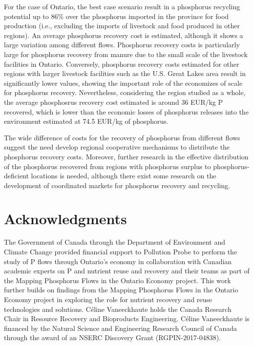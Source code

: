 \documentclass[authoryear]{elsarticle}
\begin{document}
For the case of Ontario, the best case scenario result in a phosphorus recycling potential up to 86\% over the phosphorus imported in the province for food production (i.e., excluding the imports of livestock and food produced in other regions). An average phosphorus recovery cost is estimated, although it shows a large variation among different flows. Phosphorus recovery costs is particularly large for phosphorus recovery from manure due to the small scale of the livestock facilities in Ontario. Conversely, phosphorus recovery costs estimated for other regions with larger livestock facilities such as the U.S. Great Lakes area result in significantly lower values, showing the important role of the economizes of scale for phosphorus recovery. Nevertheless, considering the region studied as a whole, the average phosphosrus recovery cost estimated is around 36 EUR/kg P recovered, which is lower than the economic losses of phosphorus releases into the environment estimated at 74.5 EUR/kg of phosphorus.

The wide difference of costs for the recovery of phosphorus from different flows suggest the need develop regional cooperative mechanisms to distribute the phosphorus recovery costs. Moreover, further research in the effective distribution of the phosphorus recovered from regions with phosphorus surplus to phosphorus-deficient locations is needed, although there exist some research on the development of coordinated markets for phosphorus recovery and recycling.


\section{Acknowledgments}
The Government of Canada through the Department of Environment and Climate Change provided financial support to Pollution Probe to perform the study of P flows through Ontario’s economy in collaboration with Canadian academic experts on P and nutrient reuse and recovery and their teams as part of the Mapping Phosphorus Flows in the Ontario Economy project. This work further builds on findings from the Mapping Phosphorus Flows in the Ontario Economy project in exploring the role for nutrient recovery and reuse technologies and solutions. Céline Vaneeckhaute holds the Canada Research Chair in Resource Recovery and Bioproducts Engineering. Céline Vaneeckhaute is financed by the Natural Science and Engineering Research Council of Canada through the award of an NSERC Discovery Grant (RGPIN-2017-04838).
\end{document}
